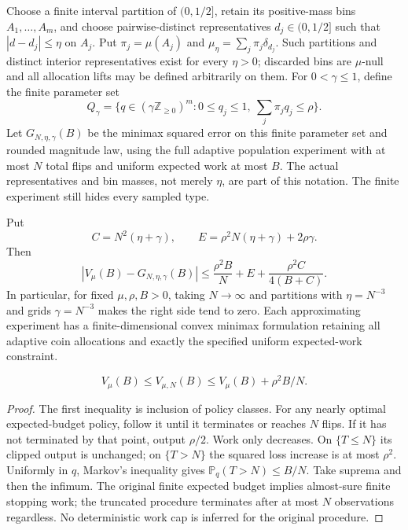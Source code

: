 Choose a finite interval partition of $(0,1/2]$, retain its positive-mass bins
$A_1,\ldots,A_m$, and choose pairwise-distinct representatives
$d_j\in(0,1/2]$ such that
$|d-d_j|\le\eta$ on $A_j$. Put $\pi_j=\mu(A_j)$ and
$\mu_\eta=\sum_j\pi_j\delta_{d_j}$. Such partitions and distinct interior
representatives exist for every $\eta>0$; discarded bins are $\mu$-null and
all allocation lifts may be defined arbitrarily on them. For
$0<\gamma\le1$, define the finite parameter set
\[
 Q_\gamma=\{q\in(\gamma\mathbb Z_{\ge0})^m:
                    0\le q_j\le1,\ \sum_j\pi_jq_j\le\rho\}.
\]
Let $G_{N,\eta,\gamma}(B)$ be the minimax squared error on this finite
parameter set and rounded magnitude law, using the full adaptive population
experiment with at most $N$ total flips and uniform expected work at most
$B$. The actual representatives and bin masses, not merely $\eta$, are part
of this notation. The finite experiment still hides every sampled type.

\begin{theorem}\label{thm:approx}
Put
\[
 C=N^2(\eta+\gamma),\qquad
 E=\rho^2N(\eta+\gamma)+2\rho\gamma.
\]
Then
\[
 \left|V_\mu(B)-G_{N,\eta,\gamma}(B)\right|
 \le \frac{\rho^2B}{N}+E+
                  \frac{\rho^2 C}{4(B+C)}.                 \tag{1}
\]
In particular, for fixed $\mu,\rho,B>0$, taking $N\to\infty$ and partitions
with $\eta=N^{-3}$ and grids $\gamma=N^{-3}$ makes the right side tend to
zero. Each approximating experiment has a finite-dimensional convex
minimax formulation retaining all adaptive coin allocations and exactly
the specified uniform expected-work constraint.
\end{theorem}

\begin{lemma}
\[
 V_\mu(B)\le V_{\mu,N}(B)
        \le V_\mu(B)+\rho^2B/N.
\]
\end{lemma}
\begin{proof}
The first inequality is inclusion of policy classes. For any nearly optimal
expected-budget policy, follow it until it terminates or reaches $N$ flips.
If it has not terminated by that point, output $\rho/2$. Work only decreases.
On $\{T\le N\}$ its clipped output is unchanged; on $\{T>N\}$ the squared
loss increase is at most $\rho^2$. Uniformly in $q$, Markov's inequality
gives $\mathbb P_q(T>N)\le B/N$. Take suprema and then the infimum. The
original finite expected budget implies almost-sure finite stopping work;
the truncated procedure terminates after at most $N$ observations regardless.
No deterministic work cap is inferred for the original procedure.
\end{proof}

